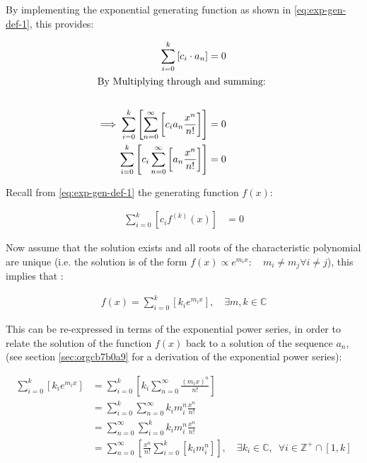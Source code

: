 \documentclass[11pt]{article}
\begin{document}
By implementing the exponential generating function as shown in \eqref{eq:exp-gen-def-1}, this provides:


\begin{align}
    \sum^{k}_{i= 0}   {\left[{ c_i \cdot a_n } \right]} = 0 \nonumber \\
    \intertext{By Multiplying through and summing: } \notag \\
     \implies  \sum^{k}_{i= 0}   {\left[{ \sum^{\infty}_{n= 0}   {\left[{ c_i a_n \frac{x^n}{n!} }\right]}  }\right]}  \nonumber = 0 \\
     \sum^{k}_{i= 0}    {\left[{ c_i \sum^{\infty}_{n= 0}   {\left[{  a_n \frac{x^n}{n!} }\right]}  }\right]}  \nonumber = 0 \\
\end{align}

Recall from \eqref{eq:exp-gen-def-1} the generating function \(f{\left({ x }\right)}\):

\begin{align}
\sum^{k}_{i= 0}   {\left[{ c_i f^{{\left({ k }\right)} } } {\left({ x }\right)} \right]} \label{eq:exp-gen-def-proof}  &= 0
\end{align}


Now assume that the solution exists and all roots of the characteristic polynomial are unique (i.e. the solution is of the form \(f{\left({ x }\right)} \propto e^{m_i x}: \quad m_i \neq m_j \forall i\neq j\)), this implies that \cite[Ch. 4]{Zil2009} :

\begin{align}
    f{\left({ x }\right)} = \sum^{k}_{i= 0}   {\left[{ k_i e^{m_i x} }\right]}, \quad \exists m,k \in \mathbb{C} \nonumber
\end{align}

This can be re-expressed in terms of the exponential power series, in order to relate the solution of the function \(f{\left({ x }\right)}\) back to a solution of the sequence \(a_n\), (see section \ref{sec:orgcb7b0a9} for a derivation of the exponential power series):

\begin{align}
    \sum^{k}_{i= 0}   {\left[{ k_i e^{m_i x}  }\right]}  &= \sum^{k}_{i= 0}   {\left[{ k_i \sum^{\infty}_{n= 0}   \frac{{\left({ m_i x }\right)}^n}{n!}  }\right]}  \nonumber \\
							 &= \sum^{k}_{i= 0}  \sum^{\infty}_{n= 0}   k_i m_i^n \frac{x^n}{n!} \nonumber\\
							 &=    \sum^{\infty}_{n= 0} \sum^{k}_{i= 0}   k_i m_i^n \frac{x^n}{n!} \nonumber \\
							 &= \sum^{\infty}_{n= 0} {\left[{ \frac{x^n}{n!}  \sum^{k}_{i=0}   {\left[{ k_im^n_i }\right]}  }\right]}, \quad \exists k_i \in \mathbb{C}, \enspace \forall i \in \mathbb{Z}^+\cap {\left[{ 1, k }\right]}     \label{eq:unique-root-sol-power-series-form}
\end{align}
\end{document}
